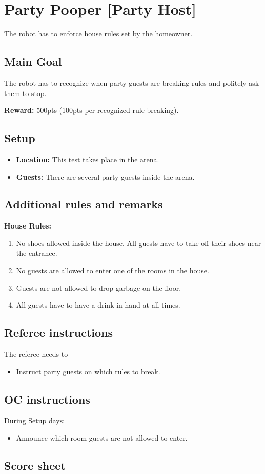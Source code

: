 \section{Party Pooper [Party Host]}
The robot has to enforce house rules set by the homeowner.


\subsection{Main Goal}
The robot has to recognize when party guests are breaking rules and politely ask them to stop.

\noindent\textbf{Reward:} 500pts (100pts per recognized rule breaking).

\subsection{Setup}
\begin{itemize}[nosep]
	\item \textbf{Location:} This test takes place in the arena.
	\item \textbf{Guests:} There are several party guests inside the arena.
\end{itemize}


\subsection{Additional rules and remarks}
\textbf{House Rules:}
\begin{enumerate}[nosep]
	\item No shoes allowed inside the house. All guests have to take off their shoes near the entrance.
	\item No guests are allowed to enter one of the rooms in the house.
	\item Guests are not allowed to drop garbage on the floor.
	\item All guests have to have a drink in hand at all times.
\end{enumerate}

\subsection{Referee instructions}

The referee needs to
\begin{itemize}
	\item Instruct party guests on which rules to break.
\end{itemize}

\subsection{OC instructions}
During Setup days:
\begin{itemize}
	\item Announce which room guests are not allowed to enter.
\end{itemize}

\newpage
\subsection{Score sheet}



